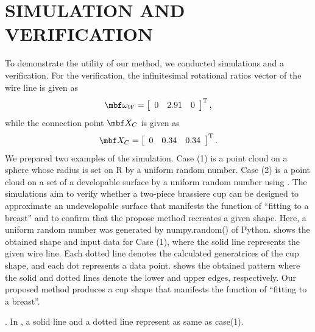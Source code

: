 \documentclass[E]{scitrans}
\begin{document}
\section*{SIMULATION AND VERIFICATION}
To demonstrate the utility of our method, we conducted simulations and a verification. For the verification, the infinitesimal rotational ratios vector   of the wire line is given as
\begin{equation}\label{eq:vrf_omgW}
\mbold{\omega}_W = \left[ \begin{array}{ccc}
0 & 2.91 & 0
\end{array}\right]^\mathrm{T}, 
\end{equation}
while the connection point $ \mbold{X}_C $ is given as 
\begin{equation}\label{eq:givenXc}
\mbold{X}_C = \left[ \begin{array}{ccc}
0 & 0.34 & 0.34
\end{array}\right]^\mathrm{T}.
\end{equation}
We prepared two examples of the simulation. Case (1) is a point cloud on a sphere whose radius is set on R by a uniform random number. Case (2) is a point cloud on a set of a developable surface by a uniform random number using . 
The simulations aim to verify whether a two-piece brassiere cup can be designed to approximate an undevelopable surface that manifests the function of “fitting to a breast” and to confirm that the propose method recreates a given shape. Here, a uniform random number was generated by numpy.random() of Python. shows the obtained shape and input data for Case (1), where the solid line represents the given wire line. Each dotted line denotes the calculated generatrices of the cup shape, and each dot represents a data point.  shows the obtained pattern where the solid and dotted lines denote the lower and upper edges, respectively. Our proposed method produces a cup shape that manifests the function of “fitting to a breast”.

 . In , a solid line and a dotted line represent as same as case(1).
\end{document}
